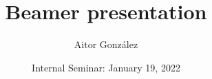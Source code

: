 \documentclass{beamer}
\title{Beamer presentation}
\author{Aitor Gonz\'alez}
\institute{TAGC/INSERM U1090}
\date{Internal Seminar: January 19, 2022}
\begin{document}
\begin{frame}

\titlepage

\end{frame}
\end{document}
